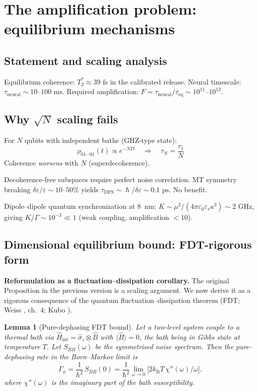 \documentclass[twocolumn,10pt]{article}
\renewcommand{\hbar}{\hslash}
\newcommand{\kB}{k_{\text{B}}}
\newcommand{\ps}{\text{~ps}}
\newcommand{\fs}{\text{~fs}}
\newcommand{\DFS}{\text{DFS}}
\newtheorem{lemma}{Lemma}
\begin{document}
\section{The amplification problem: equilibrium mechanisms}

\subsection{Statement and scaling analysis}

Equilibrium coherence: $T_2^* \approx 39\fs$ in the calibrated release. Neural
timescale: $\tau_{\text{neural}} \sim 10\text{--}100\text{~ms}$. Required
amplification: $F = \tau_{\text{neural}}/\tau_{\text{eq}} \sim
10^{11}\text{--}10^{12}$.


\subsection{Why $\sqrt{N}$ scaling fails}

For $N$ qubits with independent baths (GHZ-type state):
\begin{equation}
\rho_{01\cdots01}(t) \propto e^{-N\Gamma t} \quad \Rightarrow \quad
\tau_N = \frac{\tau_1}{N}
\end{equation}
Coherence \textit{worsens} with $N$ (superdecoherence).

Decoherence-free subspaces require perfect noise correlation. MT symmetry
breaking $\delta\varepsilon/\varepsilon \sim 10\text{--}50\%$
\cite{Sept2003} yields $\tau_{\DFS} \sim \hbar/\delta\varepsilon
\sim 0.1\ps$. No benefit.

Dipole--dipole quantum synchronization at 8~nm:
$K \sim \mu^2/(4\pi\varepsilon_0\varepsilon_r a^3) \sim 2\text{~GHz}$,
giving $K/\Gamma \sim 10^{-3} \ll 1$ (weak coupling, amplification $<10$).


\subsection{Dimensional equilibrium bound: FDT-rigorous form}

\textbf{Reformulation as a fluctuation--dissipation corollary.}
The original Proposition in the previous version is a scaling argument.
We now derive it as a rigorous consequence of the quantum
fluctuation--dissipation theorem (FDT; Weiss \cite{Weiss2008}, ch.~4;
Kubo \cite{Kubo1966}).

\begin{lemma}[Pure-dephasing FDT bound]\label{lem:FDT}
Let a two-level system couple to a thermal bath via
$\hat{H}_{\text{int}}=\hat\sigma_z\otimes\hat{B}$ with
$\langle\hat B\rangle=0$, the bath being in Gibbs state at temperature
$T$. Let $S_{BB}(\omega)$ be the symmetrised noise spectrum. Then the
pure-dephasing rate in the Born--Markov limit is
\begin{equation}
\Gamma_\phi = \frac{1}{\hbar^2}\, S_{BB}(0)
= \frac{1}{\hbar^2}\lim_{\omega\to 0}
\bigl[2\kB T\, \chi''(\omega)/\omega\bigr],
\label{eq:FDT_pure_dephasing}
\end{equation}
where $\chi''(\omega)$ is the imaginary part of the bath susceptibility.
\end{lemma}
\end{document}

